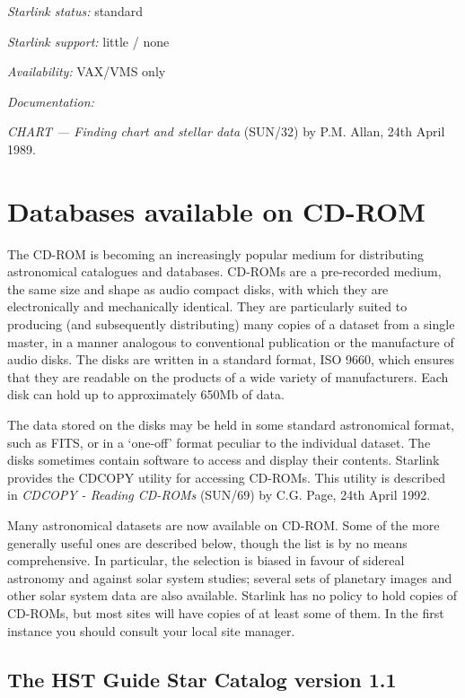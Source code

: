 \documentclass[twoside,11pt]{article}
\newcommand{\xref}[3]{#1}
\newcommand{\xlabel}[1]{}
\begin{document}
{\it Starlink status:} standard

{\it Starlink support:} little / none

{\it Availability:} VAX/VMS only

{\it Documentation:}

{\it CHART --- Finding chart and stellar data}
(\xref{SUN/32}{sun32}{}) by P.M. Allan,
24th April 1989.


\section{Databases available on CD-ROM
\xlabel{databases_available_on_cdrom}}

The CD-ROM is becoming an increasingly popular medium for distributing
astronomical catalogues and databases. CD-ROMs are a pre-recorded
medium, the same size and shape as audio compact disks, with which they
are electronically and mechanically identical. They are particularly
suited to producing (and subsequently distributing) many copies of a
dataset from a single master, in a manner analogous to conventional
publication or the manufacture of audio disks. The disks are written
in a standard format, ISO 9660, which ensures that they are readable
on the products of a wide variety of manufacturers. Each disk can hold
up to approximately 650Mb of data.

The data stored on the disks may be held in some standard astronomical
format, such as FITS, or in a `one-off' format peculiar to the
individual dataset. The disks sometimes contain software to access and
display their contents. Starlink provides the CDCOPY utility for
accessing CD-ROMs. This utility is described in {\it CDCOPY - Reading
CD-ROMs}
(SUN/69) by C.G. Page, 24th April 1992.

Many astronomical datasets are now available on CD-ROM. Some of the more
generally useful ones are described below, though the list is by no
means comprehensive. In particular, the selection is biased in favour of
sidereal astronomy and against solar system studies; several sets of
planetary images and other solar system data are also available.
Starlink has no policy to hold copies of CD-ROMs, but most sites will
have copies of at least some of them. In the first instance you should
consult your local site manager.

\subsection{The HST Guide Star Catalog version 1.1
\xlabel{the_hst_guide_star_catalog_version_11}\label{GSC}}
\end{document}
